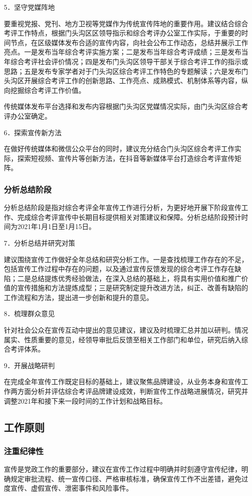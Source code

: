 \documentclass[12pt]{article} %
\begin{document}
5．坚守党媒阵地

要重视党报、党刊、地方卫视等党媒作为传统宣传阵地的重要作用。建议结合综合考评工作特点，根据门头沟区区领导指示和综合考评办公室工作实际，于重要的时间节点，在区级媒体发布合适的宣传内容，向社会公布工作动态，总结并展示工作亮点。一是发布当年综合考评实施方案；二是发布当年综合考评成绩；三是发布当年综合考评社会评价情况；四是发布门头沟区领导干部关于综合考评工作的指示或思路；五是发布专家学者对于门头沟区综合考评工作特色的专题解读；六是发布门头沟区开展综合考评工作的创新思路、工作亮点、成熟模式、机制体系等内容，纵向挖掘综合考评工作价值。

传统媒体发布平台选择和发布内容根据门头沟区党媒情况实际，由门头沟区综合考评办公室确定。

6．探索宣传新方法

在做好传统媒体和微信公众平台的同时，建议充分结合门头沟区综合考评工作实际，探索短视频、宣传片等创新方法，在抖音等新媒体平台打造综合考评宣传矩阵。

\subsubsection{分析总结阶段}
分析总结阶段是指对综合考评全年宣传工作进行分析，为更好地开展下阶段宣传工作、完成综合考评宣传中长期目标提供相关对策建议和保障。分析总结阶段预计时间为2021年1月1日至1月15日。

7．分析总结并研究对策

建议围绕宣传工作做好全年总结和研究分析工作。一是查找梳理工作存在的不足，包括宣传工作过程中存在的问题，以及通过宣传反馈发现的综合考评工作存在缺陷；二是总结提炼优秀经验做法，在深入总结的基础上，将具有实用价值和推广价值的宣传措施和方法提炼成型；三是研究制定提升改进方法，纠正、改善有缺陷的工作流程和方法，提出进一步创新和提升的意见。

8．梳理群众意见

针对社会公众在宣传互动中提出的意见建议，建议及时梳理汇总并加以研判。情况属实、性质重要的意见，经领导审批后反馈至相关工作部门和单位，研究后纳入综合考评体系。

9．开展战略研判

在完成全年宣传工作既定目标的基础上，建议聚焦品牌建设，从业务本身和宣传工作两方面分析并评估综合考评品牌建设成效，判断宣传工作战略进展情况，研究并调整2021年和接下来一段时间的工作计划和战略目标。

\subsection{工作原则}
\subsubsection{注重纪律性}
宣传是党政工作的重要部分，建议在宣传工作过程中明确并时刻遵守宣传纪律，明确规定审批流程、统一宣传口径、严格审核标准，确保宣传工作不出差错，避免过度宣传、虚假宣传、泄密事件和风险事件。
\end{document}
